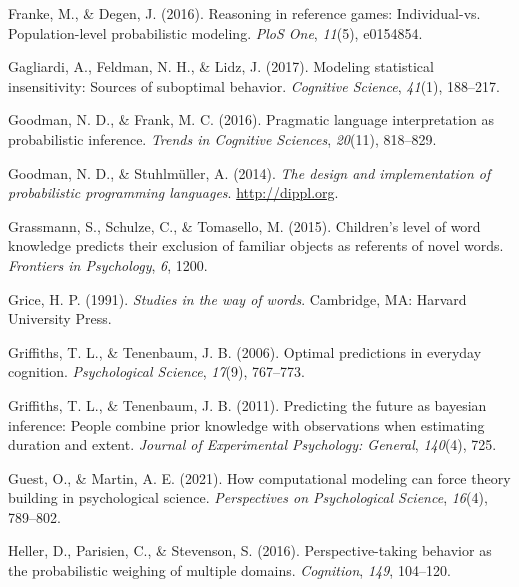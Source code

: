 \documentclass[
  man,floatsintext]{apa6}
\newlength{\cslhangindent}
\newlength{\cslentryspacingunit} %
\newenvironment{CSLReferences}[2] %
 {%
  \setlength{\parindent}{0pt}
  \ifodd #1
  \let\oldpar\par
  \def\par{\hangindent=\cslhangindent\oldpar}
  \fi
  \setlength{\parskip}{#2\cslentryspacingunit}
 }%
 {}
\begin{document}
\begin{CSLReferences}{1}{0}
\leavevmode{}%
Franke, M., \& Degen, J. (2016). Reasoning in reference games: Individual-vs. Population-level probabilistic modeling. \emph{PloS One}, \emph{11}(5), e0154854.

\leavevmode{}%
Gagliardi, A., Feldman, N. H., \& Lidz, J. (2017). Modeling statistical insensitivity: Sources of suboptimal behavior. \emph{Cognitive Science}, \emph{41}(1), 188--217.

\leavevmode{}%
Goodman, N. D., \& Frank, M. C. (2016). Pragmatic language interpretation as probabilistic inference. \emph{Trends in Cognitive Sciences}, \emph{20}(11), 818--829.

\leavevmode{}%
Goodman, N. D., \& Stuhlmüller, A. (2014). \emph{{The design and implementation of probabilistic programming languages}}. \url{http://dippl.org}.

\leavevmode{}%
Grassmann, S., Schulze, C., \& Tomasello, M. (2015). Children's level of word knowledge predicts their exclusion of familiar objects as referents of novel words. \emph{Frontiers in Psychology}, \emph{6}, 1200.

\leavevmode{}%
Grice, H. P. (1991). \emph{Studies in the way of words}. Cambridge, MA: Harvard University Press.

\leavevmode{}%
Griffiths, T. L., \& Tenenbaum, J. B. (2006). Optimal predictions in everyday cognition. \emph{Psychological Science}, \emph{17}(9), 767--773.

\leavevmode{}%
Griffiths, T. L., \& Tenenbaum, J. B. (2011). Predicting the future as bayesian inference: People combine prior knowledge with observations when estimating duration and extent. \emph{Journal of Experimental Psychology: General}, \emph{140}(4), 725.

\leavevmode{}%
Guest, O., \& Martin, A. E. (2021). How computational modeling can force theory building in psychological science. \emph{Perspectives on Psychological Science}, \emph{16}(4), 789--802.

\leavevmode{}%
Heller, D., Parisien, C., \& Stevenson, S. (2016). Perspective-taking behavior as the probabilistic weighing of multiple domains. \emph{Cognition}, \emph{149}, 104--120.


\end{CSLReferences}
\end{document}
